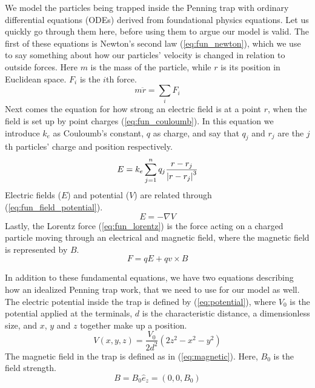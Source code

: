 We model the particles being trapped inside the Penning trap with ordinary differential equations (ODEs) derived from foundational physics equations. Let us quickly go through them here, before using them to argue our model is valid. The first of these equations is Newton's second law (\ref{eq:fun_newton}), which we use to say something about how our particles' velocity is changed in relation to outside forces. Here $m$ is the mass of the particle, while $r$ is its position in Euclidean space. $F_i$ is the $i$th force.
%
\begin{equation}
\label{eq:fun_newton}
m \ddot r = \sum_i F_i
\end{equation}
%
Next comes the equation for how strong an electric field is at a point $r$, when the field is set up by point charges (\ref{eq:fun_couloumb}). In this equation we introduce $k_e$ as Couloumb's constant, $q$ as charge, and say that $q_j$ and $r_j$ are the $j$th particles' charge and position respectively.
%
\begin{equation}
\label{eq:fun_couloumb}
E = k_e \sum_{j=1}^n q_j \frac{r - r_j}{\abs{r - r_j}^3}
\end{equation}
%
Electric fields ($E$) and potential ($V$) are related through (\ref{eq:fun_field_potential}).
\begin{equation}
\label{eq:fun_field_potential}
E = - \nabla V
\end{equation}
%
Lastly, the Lorentz force (\ref{eq:fun_lorentz}) is the force acting on a charged particle moving through an electrical and magnetic field, where the magnetic field is represented by $B$.
%
\begin{equation}
\label{eq:fun_lorentz}
F = qE + qv \times B 
\end{equation}

In addition to these fundamental equations, we have two equations describing how an idealized Penning trap work, that we need to use for our model as well. The electric potential inside the trap is defined by (\ref{eq:potential}), where $V_0$ is the potential applied at the terminals, $d$ is the characteristic distance, a dimensionless size, and $x$, $y$ and $z$ together make up a position.
%
\begin{equation}
\label{eq:potential}
V(x, y, z) = \frac{V_0}{2d^2}(2z^2 - x^2 - y^2)
\end{equation}
%
The magnetic field in the trap is defined as in (\ref{eq:magnetic}). Here, $B_0$ is the field strength.
%
\begin{equation}
\label{eq:magnetic}
B = B_0 \hat{e}_z = (0, 0, B_0)
\end{equation}

